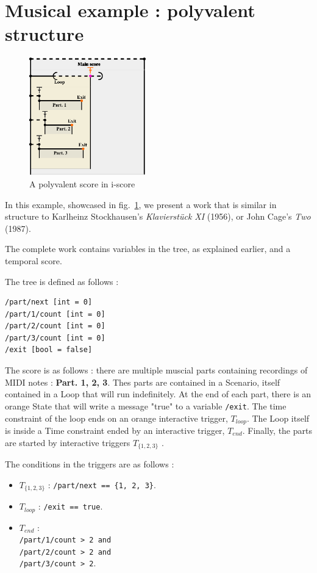 \documentclass{article}
\begin{document}
\section{Musical example : polyvalent structure}
\begin{figure}
    \includegraphics[width=0.45\textwidth]{images/partition.eps}
    \caption{A polyvalent score in i-score}
    \label{fig.polyvalent}
\end{figure}

In this example, showcased in fig.~\ref{fig.polyvalent}, we present a work that is similar in structure to Karlheinz Stockhausen's \emph{Klavierstück XI} (1956), or John Cage's \emph{Two} (1987). 

The complete work contains variables in the tree, as explained earlier, and a temporal score.

The tree is defined as follows : 
\begin{lstlisting}
/part/next [int = 0]
/part/1/count [int = 0]
/part/2/count [int = 0]
/part/3/count [int = 0]
/exit [bool = false]
\end{lstlisting}

The score is as follows : there are multiple muscial parts containing recordings of MIDI notes : \textbf{Part. 1, 2, 3}.
Thes parts are contained in a Scenario, itself contained in a Loop that will run indefinitely. 
At the end of each part, there is an orange State that will write a message "true" to a variable \verb|/exit|.
The time constraint of the loop ends on an orange interactive trigger, $T_{loop}$.
The Loop itself is inside a Time constraint ended by an interactive trigger, $T_{end}$.
Finally, the parts are started by interactive triggers  $T_{\{1, 2, 3\}}$ .

The conditions in the triggers are as follows : 
\begin{itemize}
\item  $T_{\{1, 2, 3\}}$ : \verb|/part/next == {1, 2, 3}|.
\item $T_{loop}$ : \verb|/exit == true|.
\item $T_{end}$ : ~\\
\verb|/part/1/count > 2 and| \\
\verb|/part/2/count > 2 and| \\
\verb|/part/3/count > 2|.
\end{itemize}
\end{document}
